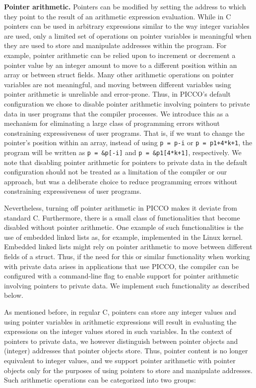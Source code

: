 \documentclass[11pt]{article}
\begin{document}
\medskip \noindent \textbf{Pointer arithmetic.} Pointers can be modified
by setting the address to which they point to the result of an arithmetic
expression evaluation. While in C pointers can be used in arbitrary
expressions similar to the way integer variables are used, only a limited
set of operations on pointer variables is meaningful when they are used to 
store and manipulate addresses within the program. For example, pointer
arithmetic can be relied upon to increment or decrement a pointer value by
an integer amount to move to a different position within an array or between
struct fields. Many other arithmetic operations on pointer variables are not
meaningful, and moving between different variables using pointer arithmetic
is unreliable and error-prone. Thus, in PICCO's default configuration we
chose to disable pointer arithmetic involving pointers to private data in
user programs that the compiler processes. We introduce this as a mechanism
for eliminating a large class of programming errors without constraining
expressiveness of user programs. That is, if we want to change the pointer's
position within an array, instead of using \texttt{p = p-i} or \texttt{p =
p1+4*k+1}, the program will be written as \texttt{p = \&p[-i]} and \texttt{p
= \&p1[4*k+1]}, respectively. We note that disabling pointer arithmetic for
pointers to private data in the default configuration should not be treated
as a limitation of the compiler or our approach, but was a deliberate choice
to reduce programming errors without constraining expressiveness of user
programs.

Nevertheless, turning off pointer arithmetic in PICCO makes it deviate from
standard C. Furthermore, there is a small class of functionalities that
become disabled without pointer arithmetic. One example of such
functionalities is the use of embedded linked lists as, for example,
implemented in the Linux kernel. Embedded linked lists might rely on pointer
arithmetic to move between different fields of a struct. Thus, if the need
for this or similar functionality when working with private data arises in
applications that use PICCO, the compiler can be configured with a
command-line flag to enable support for pointer arithmetic involving
pointers to private data. We implement such functionality as described below.

As mentioned before, in regular C, pointers can store any integer values and
using pointer variables in arithmetic expressions will result in evaluating
the expressions on the integer values stored in such variables. In the
context of pointers to private data, we however distinguish between pointer
objects and (integer) addresses that pointer objects store. Thus, pointer
content is no longer equivalent to integer values, and we support pointer
arithmetic with pointer objects only for the purposes of using pointers to
store and manipulate addresses. Such arithmetic operations can be
categorized into two groups:
\end{document}
